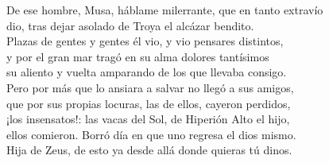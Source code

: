 \begin{versocita}
De ese hombre, Musa, háblame milerrante, que en tanto extravío\\
dio, tras dejar asolado de Troya el alcázar bendito.\\
Plazas de gentes y gentes él vio, y vio pensares distintos,\\
y por el gran mar tragó en su alma dolores tantísimos\\
su aliento y vuelta amparando de los que llevaba consigo.\\
Pero por más que lo ansiara a salvar no llegó a sus amigos,\\
que por sus propias locuras, las de ellos, cayeron perdidos,\\
¡los insensatos!: las vacas del Sol, de Hiperión Alto el hijo,\\
ellos comieron. Borró día en que uno regresa el dios mismo.\\
Hija de Zeus, de esto ya desde allá donde quieras tú dinos.
\end{versocita}


%
%
%


